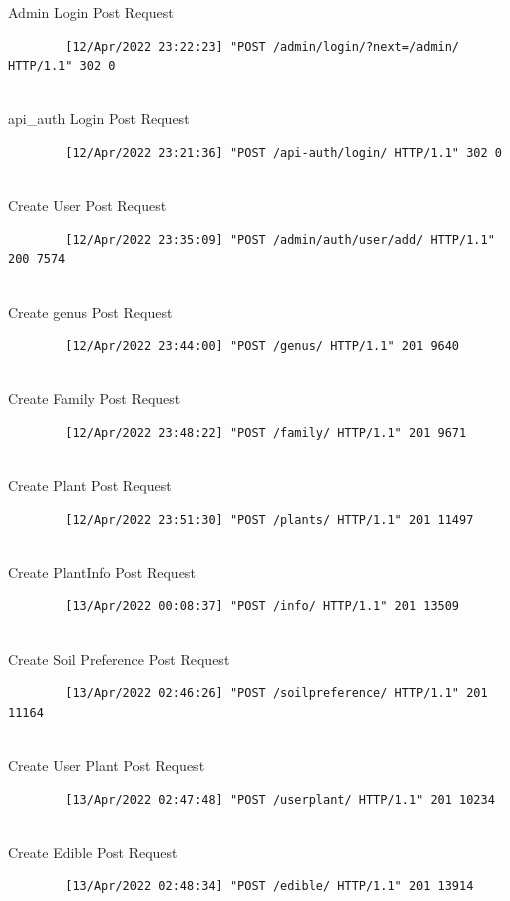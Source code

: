 \documentclass{article}
\begin{document}
	Admin Login Post Request
	\begin{verbatim}
		[12/Apr/2022 23:22:23] "POST /admin/login/?next=/admin/ HTTP/1.1" 302 0
	\end{verbatim}
	\\
	api\_auth Login Post Request
	\begin{verbatim}
		[12/Apr/2022 23:21:36] "POST /api-auth/login/ HTTP/1.1" 302 0
	\end{verbatim}
	\\
	Create User Post Request
	\begin{verbatim}
		[12/Apr/2022 23:35:09] "POST /admin/auth/user/add/ HTTP/1.1" 200 7574
	\end{verbatim}
	\\
	Create genus Post Request
	\begin{verbatim}
		[12/Apr/2022 23:44:00] "POST /genus/ HTTP/1.1" 201 9640
	\end{verbatim}
	\\
	Create Family Post Request
	\begin{verbatim}
		[12/Apr/2022 23:48:22] "POST /family/ HTTP/1.1" 201 9671
	\end{verbatim}
	\\
	Create Plant Post Request
	\begin{verbatim}
		[12/Apr/2022 23:51:30] "POST /plants/ HTTP/1.1" 201 11497
	\end{verbatim}
	\\
	Create PlantInfo Post Request
	\begin{verbatim}
		[13/Apr/2022 00:08:37] "POST /info/ HTTP/1.1" 201 13509
	\end{verbatim}
	\\
	Create Soil Preference Post Request
	\begin{verbatim}
		[13/Apr/2022 02:46:26] "POST /soilpreference/ HTTP/1.1" 201 11164
	\end{verbatim}
	\\
	Create User Plant Post Request
	\begin{verbatim}
		[13/Apr/2022 02:47:48] "POST /userplant/ HTTP/1.1" 201 10234
	\end{verbatim}
	\\
	Create Edible Post Request
	\begin{verbatim}
		[13/Apr/2022 02:48:34] "POST /edible/ HTTP/1.1" 201 13914
	\end{verbatim}
	
\end{document}

